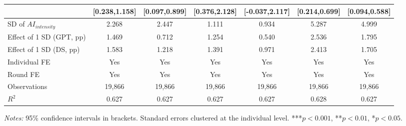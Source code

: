 \begin{table}[H]
\begin{threeparttable}
\begin{tabular}{l*{6}{c}}
            &         [0.238,1.158]         &         [0.097,0.899]         &         [0.376,2.128]         &        [-0.037,2.117]         &         [0.214,0.699]         &         [0.094,0.588]         \\
\midrule
SD of $AI_{intensity}$&                 2.268         &                 2.447         &                 1.111         &                 0.934         &                 5.287         &                 4.999         \\
Effect of 1 SD (GPT, pp)&                 1.469         &                 0.712         &                 1.254         &                 0.540         &                 2.536         &                 1.795         \\
Effect of 1 SD (DS, pp)&                 1.583         &                 1.218         &                 1.391         &                 0.971         &                 2.413         &                 1.705         \\
Individual FE&                   Yes         &                   Yes         &                   Yes         &                   Yes         &                   Yes         &                   Yes         \\
Round FE    &                   Yes         &                   Yes         &                   Yes         &                   Yes         &                   Yes         &                   Yes         \\
Observations&                19,866         &                19,866         &                19,866         &                19,866         &                19,866         &                19,866         \\
$R^2$       &                 0.627         &                 0.627         &                 0.627         &                 0.627         &                 0.628         &                 0.627         \\
\bottomrule\bottomrule
\end{tabular}
\begin{tablenotes}
\footnotesize
\item \textit{Notes:} 95\% confidence intervals in brackets. Standard errors clustered at the individual level. ***$p<0.001$, **$p<0.01$, *$p<0.05$.
\end{tablenotes}
\end{threeparttable}
\end{table}
